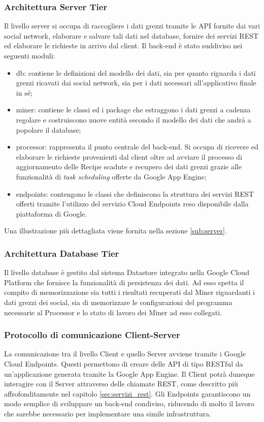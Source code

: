 		\subsubsection{Architettura Server Tier}
		Il livello server si occupa di raccogliere i dati grezzi tramite le API fornite dai vari social network, elaborare e salvare tali dati nel database, fornire dei servizi REST ed elaborare le richieste in arrivo dal client. Il back-end è stato suddiviso nei seguenti moduli:
		\begin{itemize}
		  \item db: contiene le definizioni del modello dei dati, sia per quanto riguarda i dati grezzi ricavati dai social network, sia per i dati necessari all'applicativo finale in sé;
			\item miner: contiene le classi ed i package che estraggono i dati grezzi a cadenza regolare e costruiscono nuove entità secondo il modello dei dati che andrà a popolare il database;
			\item processor: rappresenta il punto centrale del back-end. Si occupa di ricevere ed elaborare le richieste provenienti dal client oltre ad avviare il processo di aggiornamento delle Recipe scadute e recupero dei dati grezzi grazie alle funzionalità di \textit{task scheduling} offerte da Google App Engine;
			\item endpoints: contengono le classi che definiscono la struttura dei servizi REST offerti tramite l'utilizzo del servizio Cloud Endpoints reso disponibile dalla piattaforma di Google.
		\end{itemize}
		Una illustrazione più dettagliata viene fornita nella sezione \ref{sub:server}.

		\subsubsection{Architettura Database Tier}
		Il livello database è gestito dal sistema Datastore integrato nella Google Cloud Platform che fornisce la funzionalità di persistenza dei dati. Ad esso spetta il compito di memorizzazione sia tutti i risultati recuperati dal Miner riguardanti i dati grezzi dei social, sia di memorizzare le configurazioni del programma necessarie al Processor e lo stato di lavoro dei Miner ad esso collegati.

		\subsubsection{Protocollo di comunicazione Client-Server}
		La comunicazione tra il livello Client e quello Server avviene tramite i Google Cloud Endpoints. Questi permettono di creare delle API di tipo RESTful da un'applicazione generata tramite la Google App Engine. Il Client potrà duneque interagire con il Server attraverso delle chiamate REST, come descritto più affrofonditamente nel capitolo \ref{sec:servizi_rest}. Gli Endpoints garantiscono un modo semplice di sviluppare un back-end condiviso, riducendo di molto il lavoro che sarebbe necessario per implementare una simile infrastruttura.


